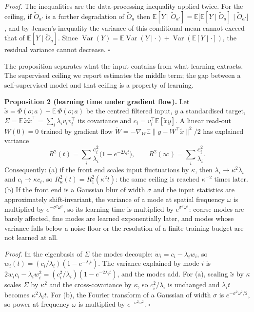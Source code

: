 \documentclass{article}
\begin{document}
\emph{Proof.} The inequalities are the data-processing inequality applied twice. For the ceiling, if \(\tilde O_{a'}\) is a further degradation of \(\tilde O_a\) then \(\mathbb E[Y\mid\tilde O_{a'}]=\mathbb E\big[\mathbb E[Y\mid\tilde O_a]\mid\tilde O_{a'}\big]\), and by Jensen's inequality the variance of this conditional mean cannot exceed that of \(\mathbb E[Y\mid\tilde O_a]\). Since \(\operatorname{Var}(Y)=\mathbb E\operatorname{Var}(Y\mid\cdot)+\operatorname{Var}(\mathbb E[Y\mid\cdot])\), the residual variance cannot decrease. \(\square\)

The proposition separates what the input contains from what learning extracts. The supervised ceiling we report estimates the middle term; the gap between a self-supervised model and that ceiling is a property of learning.

\textbf{Proposition 2 (learning time under gradient flow).} Let \(\tilde x=\Phi(o;a)-\mathbb E\,\Phi(o;a)\) be the centred filtered input, \(y\) a standardised target, \(\Sigma=\mathbb E\,\tilde x\tilde x^\top=\sum_i\lambda_i v_iv_i^\top\) its covariance and \(c_i=v_i^\top\mathbb E[\tilde x y]\). A linear read-out \(W(0)=0\) trained by gradient flow \(\dot W=-\nabla_W\mathbb E\lVert y-W^\top\tilde x\rVert^2/2\) has explained variance
\begin{equation}R^2(t)=\sum_i\frac{c_i^2}{\lambda_i}\Big(1-e^{-2\lambda_i t}\Big),\qquad R^2(\infty)=\sum_i\frac{c_i^2}{\lambda_i}.\end{equation}
Consequently: (a) if the front end scales input fluctuations by \(\kappa\), then \(\lambda_i\to\kappa^2\lambda_i\) and \(c_i\to\kappa c_i\), so \(R^2_\kappa(t)=R^2_1(\kappa^2t)\): the same ceiling is reached \(\kappa^{-2}\) times later. (b) If the front end is a Gaussian blur of width \(\sigma\) and the input statistics are approximately shift-invariant, the variance of a mode at spatial frequency \(\omega\) is multiplied by \(e^{-\sigma^2\omega^2}\), so its learning time is multiplied by \(e^{\sigma^2\omega^2}\): coarse modes are barely affected, fine modes are learned exponentially later, and modes whose variance falls below a noise floor or the resolution of a finite training budget are not learned at all.

\emph{Proof.} In the eigenbasis of \(\Sigma\) the modes decouple: \(\dot w_i=c_i-\lambda_iw_i\), so \(w_i(t)=(c_i/\lambda_i)(1-e^{-\lambda_it})\). The variance explained by mode \(i\) is \(2w_ic_i-\lambda_iw_i^2=(c_i^2/\lambda_i)(1-e^{-2\lambda_it})\), and the modes add. For (a), scaling \(\tilde x\) by \(\kappa\) scales \(\Sigma\) by \(\kappa^2\) and the cross-covariance by \(\kappa\), so \(c_i^2/\lambda_i\) is unchanged and \(\lambda_it\) becomes \(\kappa^2\lambda_it\). For (b), the Fourier transform of a Gaussian of width \(\sigma\) is \(e^{-\sigma^2\omega^2/2}\), so power at frequency \(\omega\) is multiplied by \(e^{-\sigma^2\omega^2}\). \(\square\)
\end{document}
